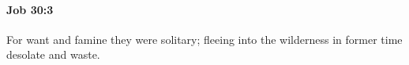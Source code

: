 
		\paragraph{Job 30:3} %
			\label{JOB-30-3}

			For want and famine they were solitary; fleeing into the wilderness in former time desolate and waste.


